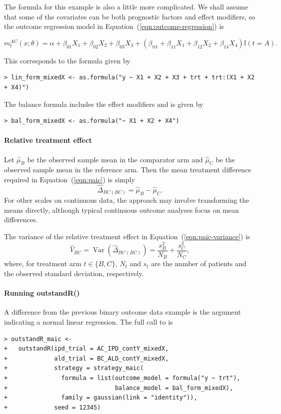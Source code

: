 \documentclass[article]{jss}
\begin{document}
The formula for this example is also a little more complicated. We shall assume that some of the covariates can be both prognostic factors and effect modifiers, so the outcome regression model in Equation~(\ref{eqn:outcome-regression}) is

$$
m_t^{AC}(x; \theta) = \alpha + \beta_{01} X_1 + \beta_{02} X_2 + \beta_{03} X_3 + (\beta_{\mathrm{trt}} + \beta_{11} X_1 + \beta_{12} X_2 + \beta_{14} X_4 ) \mathbb{I}(t = A).
$$

This corresponds to the  formula given by
\begin{verbatim}
> lin_form_mixedX <- as.formula("y ~ X1 + X2 + X3 + trt + trt:(X1 + X2 + X4)")
\end{verbatim}

The balance formula includes the effect modifiers and is given by
\begin{verbatim}
> bal_form_mixedX <- as.formula("~ X1 + X2 + X4")
\end{verbatim}

\paragraph{Relative treatment effect}
Let $\hat{\mu}_B$ be the observed sample mean in the comparator arm and $\hat{\mu}_C$ be the observed sample mean in the reference arm. Then the mean treatment difference required in Equation~(\ref{eqn:paic}) is simply
$$
\widehat{\Delta}_{BC(BC)} = \hat{\mu}_B - \hat{\mu}_C.
$$
For other scales on continuous data, the approach may involve transforming the means directly, although typical continuous outcome analyses focus on mean differences.

The variance of the relative treatment effect in Equation~(\ref{eqn:paic-variance}) is
$$
\widehat{V}_{BC} = \operatorname{Var}(\widehat{\Delta}_{BC(BC)}) = \frac{s_B^2}{N_B} + \frac{s_C^2}{N_C},
$$
where, for treatment arm $t \in \{B, C\}$, $N_t$ and $s_t$ are the number of patients and the observed standard deviation, respectively.

\paragraph{Running outstandR()}
A difference from the previous binary outcome data example is the  argument indicating a normal linear regression. The full call to  is

\begin{verbatim}
> outstandR_maic <-
+   outstandR(ipd_trial = AC_IPD_contY_mixedX, 
+             ald_trial = BC_ALD_contY_mixedX,
+             strategy = strategy_maic(
+               formula = list(outcome_model = formula("y ~ trt"),
+                              balance_model = bal_form_mixedX),
+               family = gaussian(link = "identity")),
+             seed = 12345)
\end{verbatim}
\end{document}
